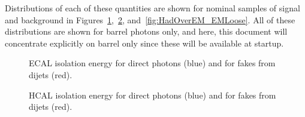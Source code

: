 \documentclass{cmspaper}
\begin{document}
Distributions of each of these quantities are shown for nominal samples of signal and background in Figures~\ref{fig:EMiso_EMLoose},~\ref{fig:HCALiso_EMLoose}, and~\ref{fig:HadOverEM_EMLoose}.  All of these distributions are shown for barrel photons only, and here, this document will concentrate explicitly on barrel only since these will be available at startup.
\begin{figure}[hbtp]
  \begin{center}
    \caption{ECAL isolation energy for direct photons (blue) and for fakes from dijets (red).}
    \label{fig:EMiso_EMLoose}
  \end{center}
\end{figure}
\begin{figure}[hbtp]
  \begin{center}
    \caption{HCAL isolation energy for direct photons (blue) and for fakes from dijets (red).}
    \label{fig:HCALiso_EMLoose}
  \end{center}
\end{figure}
\end{document}

